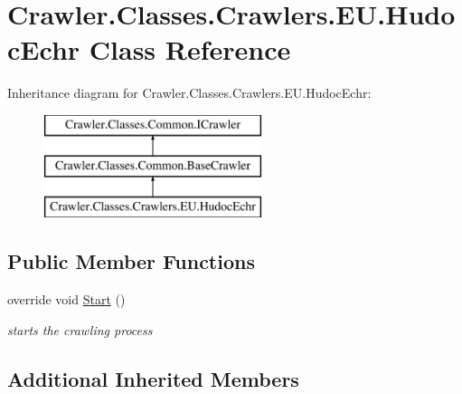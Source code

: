 \hypertarget{class_crawler_1_1_classes_1_1_crawlers_1_1_e_u_1_1_hudoc_echr}{\section{Crawler.\-Classes.\-Crawlers.\-E\-U.\-Hudoc\-Echr Class Reference}
\label{class_crawler_1_1_classes_1_1_crawlers_1_1_e_u_1_1_hudoc_echr}
}
Inheritance diagram for Crawler.\-Classes.\-Crawlers.\-E\-U.\-Hudoc\-Echr\-:\begin{figure}[H]
\begin{center}
\leavevmode
\includegraphics[height=3.000000cm]{class_crawler_1_1_classes_1_1_crawlers_1_1_e_u_1_1_hudoc_echr}
\end{center}
\end{figure}
\subsection*{Public Member Functions}
\begin{DoxyCompactItemize}
\item 
override void \hyperlink{class_crawler_1_1_classes_1_1_crawlers_1_1_e_u_1_1_hudoc_echr_ab6245fbeeef27910776856916153dee2}{Start} ()
\begin{DoxyCompactList}\small\item\em starts the crawling process \end{DoxyCompactList}\end{DoxyCompactItemize}
\subsection*{Additional Inherited Members}


